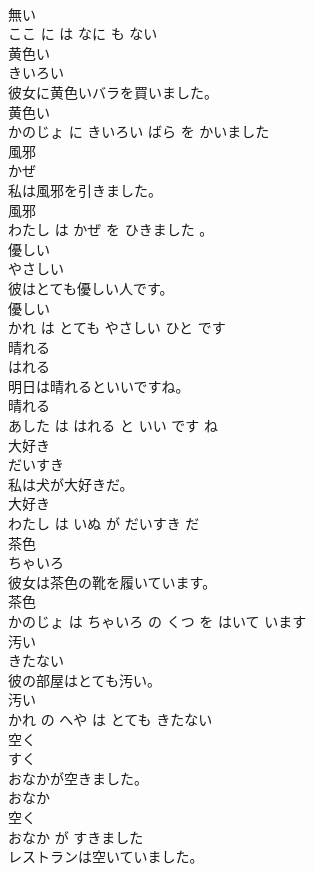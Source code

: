 \documentclass[8pt]{extreport}
\begin{document}
\begin{CJK}{UTF8}{min}
\\	無い 
\\	ここ に は なに も ない			
\\	黄色い	
\\	きいろい			
\\	彼女に黄色いバラを買いました。	
\\	黄色い 
\\	かのじょ に きいろい ばら を かいました			
\\	風邪	
\\	かぜ			
\\	私は風邪を引きました。	
\\	風邪 
\\	わたし は かぜ を ひきました 。			
\\	優しい	
\\	やさしい			
\\	彼はとても優しい人です。	
\\	優しい 
\\	かれ は とても やさしい ひと です			
\\	晴れる	
\\	はれる			
\\	明日は晴れるといいですね。	
\\	晴れる 
\\	あした は はれる と いい です ね			
\\	大好き	
\\	だいすき			
\\	私は犬が大好きだ。	
\\	大好き 
\\	わたし は いぬ が だいすき だ			
\\	茶色	
\\	ちゃいろ			
\\	彼女は茶色の靴を履いています。	
\\	茶色 
\\	かのじょ は ちゃいろ の くつ を はいて います			
\\	汚い	
\\	きたない			
\\	彼の部屋はとても汚い。	
\\	汚い 
\\	かれ の へや は とても きたない			
\\	空く	
\\	すく			
\\	おなかが空きました。	
\\	おなか 
\\	空く 
\\	おなか が すきました			
\\	レストランは空いていました。	

\end{CJK}
\end{document}
